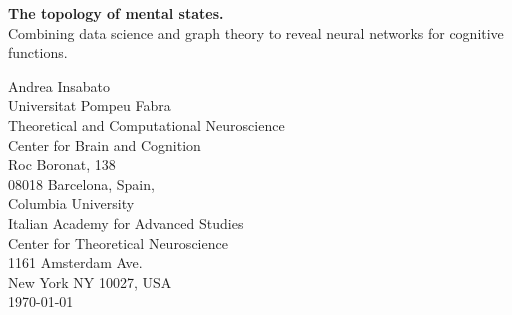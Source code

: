 \documentclass[12pt, a4paper, final, fleqn]{article}
\begin{document}
\thispagestyle{empty}
\begin{center}

\vspace*{2cm}

{ \Large {\bf The topology of mental states.} \\
Combining data science and graph theory to reveal neural networks for cognitive functions.}


\vspace*{2cm}

\large
Andrea Insabato\\[1 cm]

\normalsize
{Universitat Pompeu Fabra \\
Theoretical and Computational Neuroscience\\
Center for Brain and Cognition \\
Roc Boronat, 138\\
08018 Barcelona, Spain,} \\[1 cm]

\normalsize
{Columbia University \\
Italian Academy for Advanced Studies\\
Center for Theoretical Neuroscience\\
1161 Amsterdam Ave.\\
New York NY 10027, USA} \\[1 cm]


\vfill
\today
\end{center}
\end{document}
